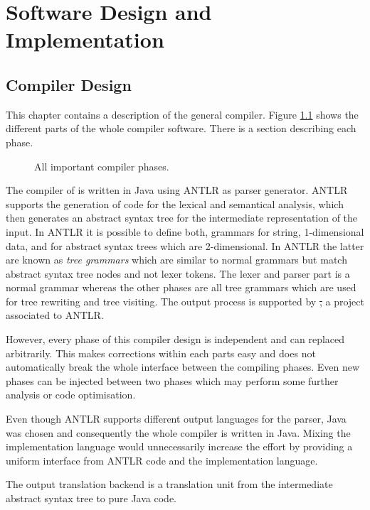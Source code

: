 \chapter{Software Design and Implementation}
\label{ctr:swDesignImplementation}

\section{Compiler Design}
This chapter contains a description of the general compiler. Figure
\ref{fig:compilerPhase} shows the different parts of the whole compiler
software. There is a section describing each phase.

\begin{figure}[ht]
	\centerline{}
	\caption{All important compiler phases.}
	\label{fig:compilerPhase}
\end{figure}

The compiler of \ooplss is written in Java using ANTLR as parser
generator. ANTLR supports the generation of code for the lexical and
semantical analysis, which then generates an abstract syntax tree for
the intermediate representation of the input. In ANTLR it is possible to
define both, grammars for string, 1-dimensional data, and for abstract syntax
trees which are 2-dimensional. In ANTLR the latter are known as \emph{tree
grammars} which are similar to normal grammars but match abstract
syntax tree nodes and not lexer tokens. The lexer and parser part is a
normal grammar whereas the other phases are all tree grammars which are
used for tree rewriting and tree visiting. The output process
is supported by \st, a project associated to ANTLR.

However, every phase of this compiler design is independent and can
replaced arbitrarily. This makes corrections within each parts easy and
does not automatically break the whole interface between the compiling
phases. Even new phases can be injected between two phases which may
perform some further analysis or code optimisation.

Even though ANTLR supports different output languages for the parser, Java was
chosen and consequently the whole compiler is written in Java. Mixing
the implementation language would unnecessarily increase the effort
by providing a uniform interface from ANTLR code and the implementation
language.

The output translation backend is a translation unit from the
intermediate abstract syntax tree to pure Java code.

